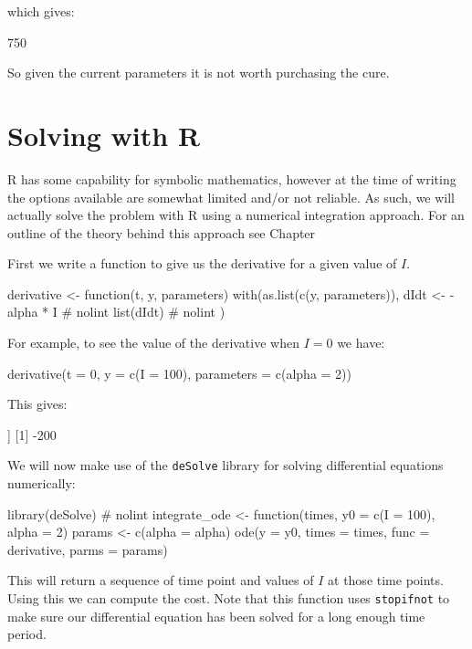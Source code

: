 which gives:

\begin{pyout}
750
\end{pyout}

So given the current parameters it is not worth purchasing the cure.

\section{Solving with R}\label{sec:solving-with-R}

R has some capability for symbolic mathematics, however at the time of writing
the options available are somewhat limited and/or not reliable. As such, we will
actually solve the problem with R using a numerical integration approach. For an
outline of the theory behind this approach see Chapter %

First we write a function to give us the derivative for a given value of \(I\).

\begin{Rin}
derivative <- function(t, y, parameters) {
  with(as.list(c(y, parameters)), {
    dIdt <- -alpha * I  # nolint
    list(dIdt)  # nolint
  })
}
\end{Rin}

For example, to see the value of the derivative when \(I=0\) we have:

\begin{Rin}
derivative(t = 0, y = c(I = 100), parameters = c(alpha = 2))
\end{Rin}

This gives:

\begin{Rout}
[[1]]
[1] -200

\end{Rout}

We will now make use of the \texttt{deSolve} library for solving
differential equations numerically:

\begin{Rin}
library(deSolve)  # nolint
integrate_ode <- function(times,
                          y0 = c(I = 100),
                          alpha = 2) {
  params <- c(alpha = alpha)
  ode(y = y0, times = times, func = derivative, parms = params)
}
\end{Rin}

This will return a sequence of time point and values of \(I\) at those time
points. Using this we can compute the cost. Note that this function uses
\texttt{stopifnot} to make sure our differential equation has been solved
for a long enough time period.

